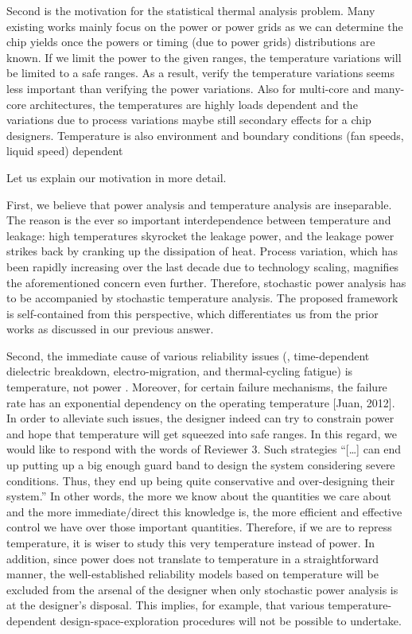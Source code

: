 \begin{reviewer}
[Comment 3] Second is the motivation for the statistical thermal analysis problem. Many existing works mainly focus on the power or power grids as we can determine the chip yields once the powers or timing (due to power grids) distributions are known. If we limit the power to the given ranges, the temperature variations will be limited to a safe ranges. As a result, verify the temperature variations seems less important than verifying the power variations. Also for multi-core and many-core architectures, the temperatures are highly loads dependent and the variations due to process variations maybe still secondary effects for a chip designers. Temperature is also environment and boundary conditions (fan speeds, liquid speed) dependent
\end{reviewer}
\begin{authors}
Let us explain our motivation in more detail.

First, we believe that power analysis and temperature analysis are inseparable.
The reason is the ever so important interdependence between temperature and leakage: high temperatures skyrocket the leakage power, and the leakage power strikes back by cranking up the dissipation of heat.
Process variation, which has been rapidly increasing over the last decade due to technology scaling, magnifies the aforementioned concern even further.
Therefore, stochastic power analysis has to be accompanied by stochastic temperature analysis.
The proposed framework is self-contained from this perspective, which differentiates us from the prior works as discussed in our previous answer.

Second, the immediate cause of various reliability issues (\eg, time-dependent dielectric breakdown, electro-migration, and thermal-cycling fatigue) is temperature, not power \perse.
Moreover, for certain failure mechanisms, the failure rate has an exponential dependency on the operating temperature [Juan, 2012].
In order to alleviate such issues, the designer indeed can try to constrain power and hope that temperature will get squeezed into safe ranges.
In this regard, we would like to respond with the words of Reviewer 3.
Such strategies ``[\ldots] can end up putting up a big enough guard band to design the system considering severe conditions.
Thus, they end up being quite conservative and over-designing their system.''
In other words, the more we know about the quantities we care about and the more immediate/direct this knowledge is, the more efficient and effective control we have over those important quantities.
Therefore, if we are to repress temperature, it is wiser to study this very temperature instead of power.
In addition, since power does not translate to temperature in a straightforward manner, the well-established reliability models based on temperature will be excluded from the arsenal of the designer when only stochastic power analysis is at the designer's disposal.
This implies, for example, that various temperature-dependent design-space-exploration procedures will not be possible to undertake.


\end{authors}
